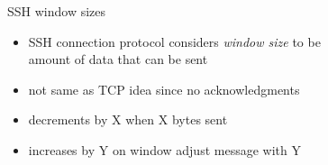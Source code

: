 \begin{frame}{SSH window sizes}
    \begin{itemize}
    \item SSH connection protocol considers \textit{window size} to be \\
        amount of data that can be sent
    \item not same as TCP idea since no acknowledgments
    \vspace{.5cm}
    \item decrements by X when X bytes sent
    \item increases by Y on window adjust message with Y
    \end{itemize}
\end{frame}
